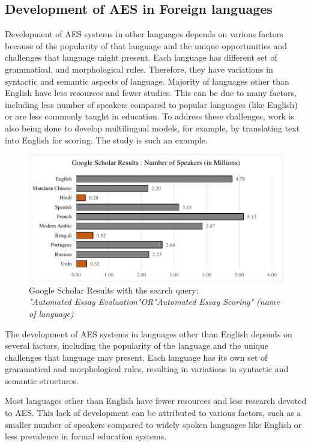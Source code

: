 \documentclass{article}
\begin{document}
	\subsection{Development of AES in Foreign languages}
	Development of AES systems in other languages depends on various factors because of the popularity of that language and the unique opportunities and challenges that language might present. Each language has different set of grammatical, and morphological rules. Therefore, they have variations in syntactic and semantic aspects of language.
	Majority of languages other than English have less resources and fewer studies. This can be due to many factors, including less number of speakers compared to popular languages (like English) or are less commonly taught in education.
	To address these challenges, work is also being done to develop multilingual models, for example,  by translating text into English for scoring. The study \textcite{firoozi2024bert} is such an example. 
	\begin{figure}
		\centering
		\includegraphics[width=\textwidth]{img/ratio.pdf}
		\caption{Google Scholar Results with the search query: \\
			\textit{"Automated Essay Evaluation"OR"Automated Essay Scoring" (name of language)}}
		
		\label{searchresult}
	\end{figure}
	The development of AES systems in languages other than English depends on several factors, including the popularity of the language and the unique challenges that language may present. Each language has its own set of grammatical and morphological rules, resulting in variations in syntactic and semantic structures.
	
	Most languages other than English have fewer resources and less research devoted to AES. This lack of development can be attributed to various factors, such as a smaller number of speakers compared to widely spoken languages like English or less prevalence in formal education systems. 
	
\end{document}
